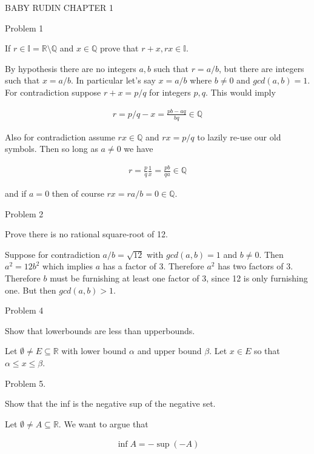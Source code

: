 \documentclass{article}
\begin{document}
	\begin{center}
		\LARGE BABY RUDIN CHAPTER 1
	\end{center}

	{\Large Problem 1

	 If $r\in\mathbb{I}=\mathbb{R}\setminus \mathbb{Q}$ and $x\in\mathbb{Q}$ prove that $r+x, rx \in\mathbb{I}$.}

	By hypothesis there are no integers $a,b$ such that $r=a/b$, but there are integers such that $x=a/b$.  In particular let's say $x=a/b$ where $b\ne 0$ and $gcd(a,b)=1$.  For contradiction suppose $r+x = p/q$ for integers $p,q$.  This would imply

	\begin{align*}
		r = p/q - x = \frac{pb-aq}{bq} \in \mathbb{Q}
	\end{align*}

	Also for contradiction assume $rx\in \mathbb{Q}$ and $rx = p/q$ to lazily re-use our old symbols.  Then so long as $a\ne 0$ we have

	\begin{align*}
		r = \frac{p}{q}\frac{1}{x} = \frac{pb}{qa} \in \mathbb{Q}
	\end{align*}

	and if $a=0$ then of course $rx = ra/b = 0\in\mathbb{Q}$.

	\pagebreak

	{\Large Problem 2

	Prove there is no rational square-root of 12.}

	Suppose for contradiction $a/b=\sqrt{12}$ with $gcd(a,b)=1$ and $b\ne 0$.  Then $a^2 = 12b^2$ which implies $a$ has a factor of 3.  Therefore $a^2$ has two factors of 3.  Therefore $b$ must be furnishing at least one factor of 3, since 12 is only furnishing one.  But then $gcd(a,b) > 1$.

	{\Large Problem 4

	Show that lowerbounds are less than upperbounds.}

	Let $\emptyset \ne E \subseteq \mathbb{R}$ with lower bound $\alpha$ and upper bound $\beta$.  Let $x\in E$ so that $\alpha\leq x\leq \beta$.

	{\Large Problem 5.

	Show that the inf is the negative sup of the negative set.}

	Let $\emptyset \ne A \subseteq \mathbb{R}$.  We want to argue that

	\begin{align*}
		\inf A = -\sup (-A)
	\end{align*}
\end{document}
